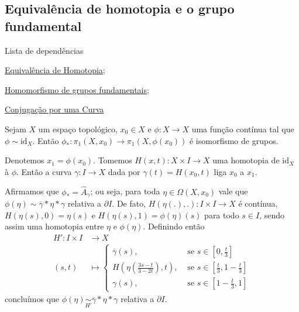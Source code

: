 \subsection{Equivalência de homotopia e o grupo fundamental}
\label{equiv-homotopia-induz-iso}
\begin{titlemize}{Lista de dependências}
    \item \hyperref[equiv-homotopia]{Equivalência de Homotopia};
	\item \hyperref[hom-grupo-fundamental]{Homomorfismo de grupos fundamentais};
    \item \hyperref[conjugacao-por-curva-prop]{Conjugação por uma Curva}
\end{titlemize}

\begin{lemma}
    Sejam $X$ um espaço topológico, $x_0\in X$ e $\phi: X \to X$ uma função contínua tal que $\phi\sim \text{id}_X$. Então $\phi_*: \pi_1(X,x_0)\to \pi_1(X,\phi(x_0))$ é isomorfismo de grupos.

    \begin{dem}
        Denotemos $x_1=\phi(x_0)$. Tomemos $H(x,t): X\times I \to X$ uma homotopia de $\text{id}_X$ à $\phi$. Então a curva $\gamma: I \to X$ dada por $\gamma(t) = H(x_0,t)$ liga $x_0$ a $x_1$.
        
        Afirmamos que $\phi_* = \hat{A}_{\gamma}$; ou seja, para toda $\eta \in \Omega(X,x_0)$ vale que $\phi(\eta) \sim \overline{\gamma} * \eta * \gamma$ relativa a $\partial I$. De fato, $H(\eta(.),.): I\times I \to X$ é contínua, $H(\eta(s),0)=\eta(s)$ e $H(\eta(s),1)=\phi(\eta)(s)$ para todo $s\in I$, sendo assim uma homotopia entre $\eta$ e $\phi(\eta)$. Definindo então\begin{align*}
            H': I\times I&\to X\\
                (s,t)&\mapsto \begin{cases}
                \overline{\gamma}(s),&\text{ se }s\in[0,\frac{t}{3}]\\
                H\left(\eta\left(\frac{3s-t}{3-2t}\right),t\right),&\text{ se }s\in[\frac{t}{3},1-\frac{t}{3}]\\
                \gamma(s),&\text{ se }s\in[1-\frac{t}{3},1]
            \end{cases}
        \end{align*}
        concluímos que $\phi(\eta) \underset{H'}{\sim} \overline{\gamma} * \eta * \gamma$ relativa a $\partial I$.
    \end{dem}
\end{lemma}


